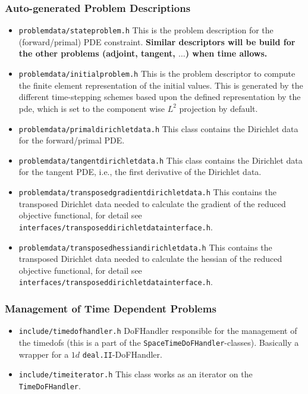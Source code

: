 \documentclass[prodmode,acmtoms]{acmsmall}
\numberwithin{equation}{section}
\begin{document}
\subsubsection{Auto-generated Problem Descriptions}
\begin{itemize}
  \item \texttt{problemdata/stateproblem.h} This is the problem description for the (forward/primal) PDE constraint.
    {\bf Similar descriptors will be build for the other problems (adjoint, tangent, $\ldots$) when time allows.}
  \item \texttt{problemdata/initialproblem.h} This is the problem descriptor to compute the finite element representation
    of the initial values. This is generated by the different time-stepping schemes based upon the defined 
    representation by the pde, which is set to the component wise $L^2$ projection by default.
  \item \texttt{problemdata/primaldirichletdata.h} This class contains the Dirichlet data for the 
    forward/primal PDE.
  \item \texttt{problemdata/tangentdirichletdata.h} This class contains the Dirichlet data for the tangent PDE, i.e.,
    the first derivative of the Dirichlet data.
  \item \texttt{problemdata/transposedgradientdirichletdata.h} This contains the transposed Dirichlet data needed 
    to calculate the gradient of the reduced objective functional, 
    for detail see \texttt{interfaces/transposeddirichletdatainterface.h}.
  \item \texttt{problemdata/transposedhessiandirichletdata.h} This contains the transposed Dirichlet data needed 
    to calculate the hessian of the reduced objective functional, 
    for detail see \texttt{interfaces/transposeddirichletdatainterface.h}.
\end{itemize}
\subsubsection{Management of Time Dependent Problems}
\begin{itemize}
\item \texttt{include/timedofhandler.h} DoFHandler responsible for the management of the timedofs (this is a part of the \texttt{SpaceTimeDoFHandler}-classes). Basically a wrapper for a $1d$ \texttt{deal.II}-DoFHandler.
\item \texttt{include/timeiterator.h} This class works as an iterator on the \texttt{TimeDoFHandler}.                 
\end{itemize}
\end{document}
